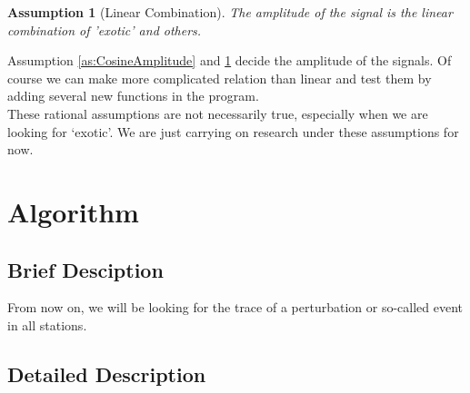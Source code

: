 \documentclass[
12pt, %
a4paper %
]{extreport}
\theoremstyle{plain}
\newtheorem{assumption}{Assumption}
\begin{document}
\begin{assumption}[Linear Combination]\label{as:LinearCombination}
	The amplitude of the signal is the linear combination of 'exotic' and others.
\end{assumption}
\noindent Assumption \ref{as:CosineAmplitude} and \ref{as:LinearCombination} decide the amplitude of the signals. Of course we can make more complicated relation than linear and test them by adding several new functions in the program. \\
These rational assumptions are not necessarily true, especially when we are looking for `exotic'. We are just carrying on research under these assumptions for now. \\
\section{Algorithm}
\subsection{Brief Desciption}
From now on, we will be looking for the trace of a perturbation or so-called event in all stations.\\ 

\subsection{Detailed Description}
\end{document}
